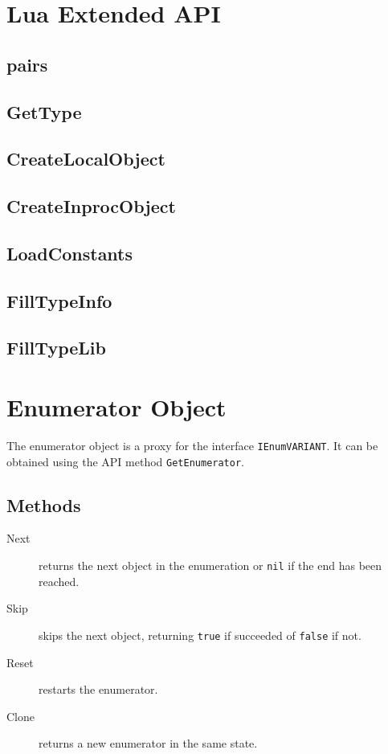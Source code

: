 \documentclass[11pt,a4paper,english]{report}
\newcommand{\ident}[1]{\mbox{\texttt{#1}}}
\begin{document}
\section{Lua Extended API}

\subsection*{pairs}

\subsection*{GetType}

\subsection*{CreateLocalObject}

\subsection*{CreateInprocObject}

\subsection*{LoadConstants}

\subsection*{FillTypeInfo}

\subsection*{FillTypeLib}

\section{Enumerator Object}
\label{sec:enumerator-object}

The enumerator object is a proxy for the interface
\ident{IEnumVARIANT}. It can be obtained using the API method
\ident{GetEnumerator}.

\subsection*{Methods}

\begin{description}

\item[Next] returns the next object in the enumeration or \ident{nil}
if the end has been reached.

\item[Skip] skips the next object, returning \ident{true} if succeeded
of \ident{false} if not.

\item[Reset] restarts the enumerator.

\item[Clone] returns a new enumerator in the same state.

\end{description}
\end{document}
